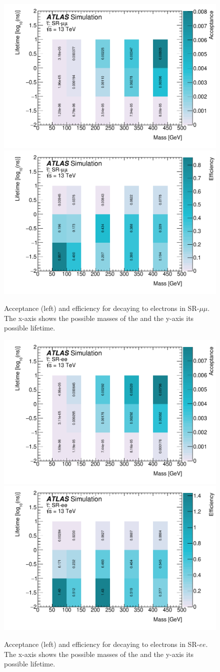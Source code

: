 \begin{figure}[htbp]
\centering
\includegraphics[width=.48\textwidth]{figures/event_selection/stau_acc_mm.pdf}
\includegraphics[width=.48\textwidth]{figures/event_selection/stau_eff_mm.pdf}
\caption{Acceptance (left) and efficiency for \stau decaying to electrons in SR-$\mu\mu$. The x-axis shows the possible masses of the \stau and the y-axis its possible lifetime.}
\label{fig:acc-eff-mm-stau}
\end{figure}

\begin{figure}[htbp]
\centering
\includegraphics[width=.48\textwidth]{figures/event_selection/stau_acc_ee.pdf}
\includegraphics[width=.48\textwidth]{figures/event_selection/stau_eff_ee.pdf}
\caption{Acceptance (left) and efficiency for \stau decaying to electrons in SR-$ee$. The x-axis shows the possible masses of the \stau and the y-axis its possible lifetime.}
\label{fig:acc-eff-ee-stau}
\end{figure}

